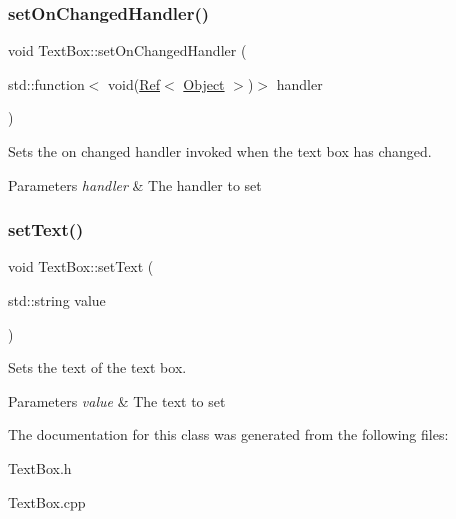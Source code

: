 \subsubsection{\texorpdfstring{setOnChangedHandler()}{setOnChangedHandler()}}
{\footnotesize\ttfamily void Text\+Box\+::set\+On\+Changed\+Handler (\begin{DoxyParamCaption}\item[{std\+::function$<$ void(\mbox{\hyperlink{class_ref}{Ref}}$<$ \mbox{\hyperlink{class_object}{Object}} $>$)$>$}]{handler }\end{DoxyParamCaption})}



Sets the on changed handler invoked when the text box has changed. 


\begin{DoxyParams}{Parameters}
{\em handler} & The handler to set\\
\hline
\end{DoxyParams}
\mbox{\label{class_text_box_a678d90393851e2aab906e53a6762d4a6}} 
\subsubsection{\texorpdfstring{setText()}{setText()}}
{\footnotesize\ttfamily void Text\+Box\+::set\+Text (\begin{DoxyParamCaption}\item[{std\+::string}]{value }\end{DoxyParamCaption})}



Sets the text of the text box. 


\begin{DoxyParams}{Parameters}
{\em value} & The text to set\\
\hline
\end{DoxyParams}


The documentation for this class was generated from the following files\+:\begin{DoxyCompactItemize}
\item 
Text\+Box.\+h\item 
Text\+Box.\+cpp\end{DoxyCompactItemize}
